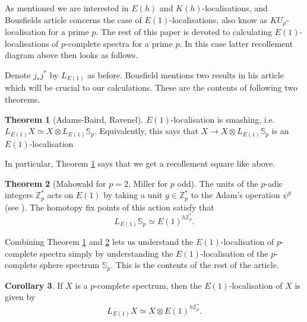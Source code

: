 \documentclass[a4paper]{article} %
\theoremstyle{definition}
\newtheorem{theorem}{Theorem} %
\newtheorem{corollary}[theorem]{Corollary}
\newcommand{\Z}{\mathbb{Z}}
\begin{document}
As mentioned we are interested in $E(h)$ and $K(h)$-localisations, and Bousfields article  concerns the case of $E(1)$-localisations, also know as $KU_p$-localisation for a prime $p$. The rest of this paper is devoted to calculating $E(1)$-localisations of $p$-complete spectra for a prime $p$. In this case latter recollement diagram above then looks as follows. 
\begin{center}
\end{center}
Denote $j_*j^*$ by $L_{E(1)}$ as before. Bousfield mentions two results in his article which will be crucial to our calculations. These are the contents of following two theorems.
\begin{theorem}[Adams-Baird, Ravenel]\label{Adams-Baird, Ravenel}
  $E(1)$-localisation is smashing, i.e. $L_{E(1)}X \simeq X \otimes L_{E(1)} \mathbb{S}_p$. Equivalently, this says that $X \to X \otimes L_{E(1)} \mathbb{S}_p$ is an $E(1)$-localisation
\end{theorem}
In particular, Theorem \ref{Adams-Baird, Ravenel} says that we get a recollement square like above.
\begin{theorem}[Mahowald for $p=2$, Miller for $p$ odd]\label{Mahowald, Miller}
     The units of the $p$-adic integers $\Z_p^*$ acts on $E(1)$ by taking a unit $g \in \Z_p^*$ to the Adam's operation $\psi^g$ (see ). The homotopy fix points of this action satisfy that
     $$L_{E(1)}\mathbb{S}_p \simeq E(1)^{h\Z_p^*}.$$
\end{theorem}
Combining Theorem \ref{Adams-Baird, Ravenel} and \ref{Mahowald, Miller} lets us understand the $E(1)$-localisation of $p$-complete spectra simply by understanding the $E(1)$-localisation of the $p$-complete sphere spectrum $\mathbb{S}_p$. This is the contents of the rest of the article.
\begin{corollary}\label{Cor:E(1)local}
  If $X$ is a $p$-complete spectrum, then the $E(1)$-localisation of $X$ is given by
  \[
    L_{E(1)} X \simeq X \otimes E(1)^{h\Z_p^*}.
  \]
\end{corollary}
\end{document}
